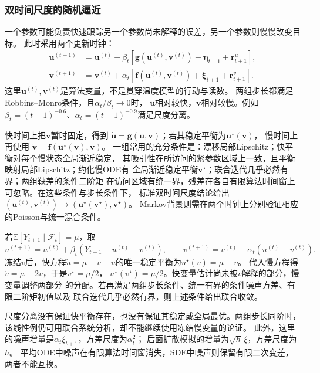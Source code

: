 \subsubsection{双时间尺度的随机逼近}
\label{sec:action-state-two-timescale}

一个参数可能负责快速跟踪另一个参数尚未解释的误差，另一个参数则慢慢改变目标。
此时采用两个更新时钟：
\begin{align*}
  \bm u^{(t+1)}
    &=\bm u^{(t)}+\beta_t[
        \bm g(\bm u^{(t)},\bm v^{(t)})+\bm\eta_{t+1}+\bm r^u_{t+1}],\\
  \bm v^{(t+1)}
    &=\bm v^{(t)}+\alpha_t[
        \bm f(\bm u^{(t)},\bm v^{(t)})+\bm\xi_{t+1}+\bm r^v_{t+1}].
\end{align*}
这里$\bm u^{(t)},\bm v^{(t)}$是算法变量，不是贯穿温度模型的行动与读数。
两组步长都满足Robbins--Monro条件，且$\alpha_t/\beta_t\to0$时，
$\bm u$相对较快，$\bm v$相对较慢。例如
$\beta_t=(t+1)^{-0.6}$、$\alpha_t=(t+1)^{-0.9}$满足尺度分离。

快时间上把$\bm v$暂时固定，得到
$\dot{\bm u}=\bm g(\bm u,\bm v)$；若其稳定平衡为$\bm u^\star(\bm v)$，
慢时间上再使用
$\dot{\bm v}=\bm f(\bm u^\star(\bm v),\bm v)$。
一组常用的充分条件是：漂移局部Lipschitz；快平衡对每个慢状态全局渐近稳定，
其吸引性在所访问的紧参数区域上一致，且平衡映射局部Lipschitz；约化慢ODE有
全局渐近稳定平衡$\bm v^\star$；联合迭代几乎必然有界；两组鞅差的条件二阶矩
在访问区域有统一界，残差在各自有限算法时间窗上可忽略。在这些条件与步长条件下，
标准双时间尺度结论给出
$(\bm u^{(t)},\bm v^{(t)})\to
(\bm u^\star(\bm v^\star),\bm v^\star)$。
Markov背景则需在两个时钟上分别验证相应的Poisson与统一混合条件。

\begin{example}[分解同一个未知均值的快慢更新]
  \label{ex:stoch-two-timescale-mean-splitting}
  若$\mathbb E[Y_{t+1}\mid\mathcal F_t]=\mu$，取
  \[
    u^{(t+1)}=u^{(t)}+\beta_t(Y_{t+1}-u^{(t)}-v^{(t)}),\qquad
    v^{(t+1)}=v^{(t)}+\alpha_t(u^{(t)}-v^{(t)}).
  \]
  冻结$v$后，快方程$\dot u=\mu-v-u$的唯一稳定平衡为$u^\star(v)=\mu-v$。
  代入慢方程得$\dot v=\mu-2v$，于是$v^\star=\mu/2$，
  $u^\star(v^\star)=\mu/2$。快变量估计尚未被$v$解释的部分，慢变量调整两部分
  的分配。若再满足两组步长条件、统一有界的条件噪声方差、有限二阶矩初值以及
  联合迭代几乎必然有界，则上述条件给出联合收敛。
\end{example}
尺度分离没有保证快平衡存在，也没有保证其稳定或全局最优。两组步长同阶时，
该线性例仍可用联合系统分析，却不能继续使用冻结慢变量的论证。
此外，这里的噪声增量是$\alpha_t\xi_{t+1}$，方差尺度为$\alpha_t^2$；
后面扩散模拟的增量为$\sqrt h\,\xi$，方差尺度为$h$。
平均ODE中噪声在有限算法时间窗消失，SDE中噪声则保留有限二次变差，两者不能互换。

